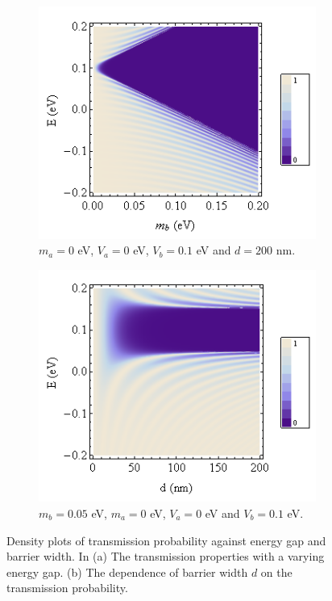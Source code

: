 \documentclass[12pt,a4paper]{report}
\begin{document}
\begin{figure}
	\begin{subfigure}{0.45\textwidth}
		\centerline{\includegraphics[scale=0.5]{images/contour-t-m}}
		\caption{$m_{a}=0$ eV, $V_{a}=0$ eV, $V_{b}=0.1$ eV and $d=200$ nm.}
	\end{subfigure}
	\hspace{1.2cm}
	\begin{subfigure}{0.45\textwidth}
		\centerline{\includegraphics[scale=0.5]{images/mass-potential-e-d}}
		\caption{$m_{b}=0.05$ eV, $m_{a}=0$ eV, $V_{a}=0$ eV and $V_{b}=0.1$ eV.}
	\end{subfigure}
	\caption{Density plots of transmission probability against energy gap and barrier width. In (a) The transmission properties with a varying energy gap. (b) The dependence of barrier width $d$ on the transmission probability.}
	\label{thinbarrier}
\end{figure}
\end{document}

